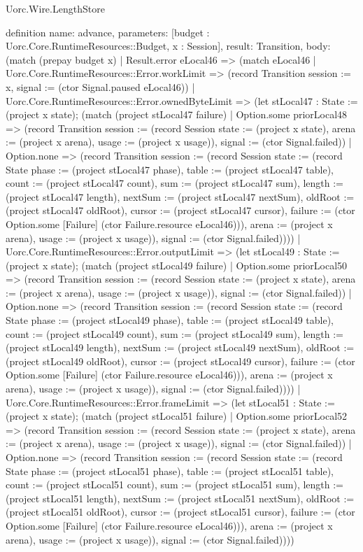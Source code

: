 \begin{lexlean}{Uorc.Wire.LengthStore}
\begin{semanticmodule}
definition{
  name: advance,
  parameters: [budget : Uorc.Core.RuntimeResources::Budget, x : Session],
  result: Transition,
  body: (match (prepay budget x)
    | Result.error eLocal46 => (match eLocal46
      | Uorc.Core.RuntimeResources::Error.workLimit => (record Transition {session := x, signal := (ctor Signal.paused eLocal46)})
      | Uorc.Core.RuntimeResources::Error.ownedByteLimit => (let stLocal47 : State := (project x state); (match (project stLocal47 failure)
        | Option.some priorLocal48 => (record Transition {session := (record Session {state := (project x state), arena := (project x arena), usage := (project x usage)}), signal := (ctor Signal.failed)})
        | Option.none => (record Transition {session := (record Session {state := (record State {phase := (project stLocal47 phase), table := (project stLocal47 table), count := (project stLocal47 count), sum := (project stLocal47 sum), length := (project stLocal47 length), nextSum := (project stLocal47 nextSum), oldRoot := (project stLocal47 oldRoot), cursor := (project stLocal47 cursor), failure := (ctor Option.some [Failure] (ctor Failure.resource eLocal46))}), arena := (project x arena), usage := (project x usage)}), signal := (ctor Signal.failed)})))
      | Uorc.Core.RuntimeResources::Error.outputLimit => (let stLocal49 : State := (project x state); (match (project stLocal49 failure)
        | Option.some priorLocal50 => (record Transition {session := (record Session {state := (project x state), arena := (project x arena), usage := (project x usage)}), signal := (ctor Signal.failed)})
        | Option.none => (record Transition {session := (record Session {state := (record State {phase := (project stLocal49 phase), table := (project stLocal49 table), count := (project stLocal49 count), sum := (project stLocal49 sum), length := (project stLocal49 length), nextSum := (project stLocal49 nextSum), oldRoot := (project stLocal49 oldRoot), cursor := (project stLocal49 cursor), failure := (ctor Option.some [Failure] (ctor Failure.resource eLocal46))}), arena := (project x arena), usage := (project x usage)}), signal := (ctor Signal.failed)})))
      | Uorc.Core.RuntimeResources::Error.frameLimit => (let stLocal51 : State := (project x state); (match (project stLocal51 failure)
        | Option.some priorLocal52 => (record Transition {session := (record Session {state := (project x state), arena := (project x arena), usage := (project x usage)}), signal := (ctor Signal.failed)})
        | Option.none => (record Transition {session := (record Session {state := (record State {phase := (project stLocal51 phase), table := (project stLocal51 table), count := (project stLocal51 count), sum := (project stLocal51 sum), length := (project stLocal51 length), nextSum := (project stLocal51 nextSum), oldRoot := (project stLocal51 oldRoot), cursor := (project stLocal51 cursor), failure := (ctor Option.some [Failure] (ctor Failure.resource eLocal46))}), arena := (project x arena), usage := (project x usage)}), signal := (ctor Signal.failed)})))
}
\end{semanticmodule}
\end{lexlean}
